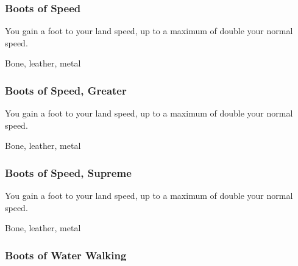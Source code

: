 \lowercase{\hypertarget{item:Boots of Speed}{}}\label{item:Boots of Speed}
\hypertarget{item:Boots of Speed}{\subsubsection{Boots of Speed\hfill{}}}

You gain a  foot  to your land speed, up to a maximum of double your normal speed.



 


 Bone, leather, metal


\lowercase{\hypertarget{item:Boots of Speed, Greater}{}}\label{item:Boots of Speed, Greater}
\hypertarget{item:Boots of Speed, Greater}{\subsubsection{Boots of Speed, Greater\hfill{}}}

You gain a  foot  to your land speed, up to a maximum of double your normal speed.



 


 Bone, leather, metal


\lowercase{\hypertarget{item:Boots of Speed, Supreme}{}}\label{item:Boots of Speed, Supreme}
\hypertarget{item:Boots of Speed, Supreme}{\subsubsection{Boots of Speed, Supreme\hfill{}}}

You gain a  foot  to your land speed, up to a maximum of double your normal speed.



 


 Bone, leather, metal


\lowercase{\hypertarget{item:Boots of Water Walking}{}}\label{item:Boots of Water Walking}
\hypertarget{item:Boots of Water Walking}{\subsubsection{Boots of Water Walking\hfill{}}}

